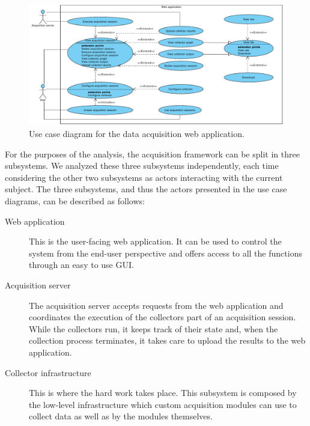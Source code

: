 \begin{figure}[p]
  \begin{adjustwidth}{-2.2cm}{-1.5cm}
  \includegraphics[width=\linewidth]{images/uc-acquisition}
  \end{adjustwidth}

  \caption[Use case diagram for the data acquisition web application.]{Use case diagram for the data acquisition web application.}
  \label{fig:uc-acquisition}
\end{figure}

For the purposes of the analysis, the acquisition framework can be split in three subsystems. We analyzed these three subsystems independently, each time considering the other two subsystems as actors interacting with the current subject. The three subsystems, and thus the actors presented in the use case diagrams, can be described as follows:

\begin{description}
  \item[Web application] This is the user-facing web application. It can be used to control the system from the end-user perspective and offers access to all the functions through an easy to use GUI.
  \item[Acquisition server] The acquisition server accepts requests from the web application and coordinates the execution of the collectors part of an acquisition session. While the collectors run, it keeps track of their state and, when the collection process terminates, it takes care to upload the results to the web application.
  \item[Collector infrastructure] This is where the hard work takes place. This subsystem is composed by the low-level infrastructure which custom acquisition modules can use to collect data as well as by the modules themselves.
\end{description}

